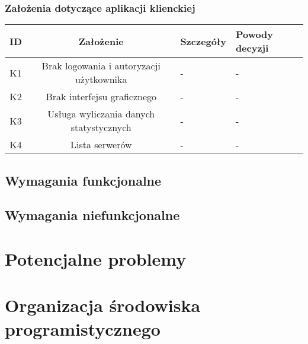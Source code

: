 \begin{center}
\subsubsection*[Założenia dotyczące aplikacji klienckiej]{Założenia dotyczące aplikacji klienckiej} \label{z:k}

\begin{tabular}{|c|c|l|l|}
\hline
\textbf{ID} & \textbf{Założenie} & \textbf{Szczegóły} & \textbf{Powody decyzji} \\
\hline
\label{z:k1} K1 & Brak logowania i autoryzacji użytkownika &  - & - \\
\hline
\label{z:k2} K2 & Brak interfejsu graficznego &  - & - \\
\hline
\label{z:k3} K3 & Usługa wyliczania danych statystycznych &  - & - \\
\hline
\label{z:k4} K4 & Lista serwerów &  - & - \\
\hline
\end{tabular} 

\end{center}

\subsection[Wymagania funkcjonalne]{Wymagania funkcjonalne}

\subsection[Wymagania niefunkcjonalne]{Wymagania niefunkcjonalne}

\section[Potencjalne problemy]{Potencjalne problemy}

\section[Organizacja środowiska programistycznego]{Organizacja środowiska programistycznego}